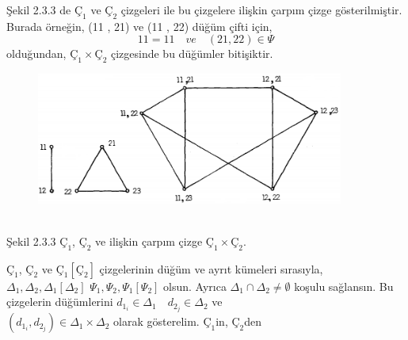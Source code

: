 \documentclass[fleqn]{book}
\begin{document}
Şekil 2.3.3 de $Ç_1$ ve $Ç_2$ çizgeleri ile bu çizgelere
ilişkin çarpım çizge gösterilmiştir. Burada
örneğin, (11 , 21) ve (11 , 22) düğüm çifti için,
\[11=11 \quad ve \quad (21 , 22) \in \Psi \]
olduğundan, $Ç_1 \times Ç_2$ çizgesinde bu düğümler
bitişiktir.
\\
\begin{figure}[htb]
	\centering
	\includegraphics[width=0.9\textwidth]{images/ceyhun-68-fig01}
\end{figure}
\\
Şekil 2.3.3 $Ç_1$, $Ç_2$ ve ilişkin çarpım çizge $Ç_1 \times Ç_2$.
\begin{tanim}
	$Ç_1$, $Ç_2$ ve $Ç_1 [Ç_2]$ çizgelerinin
	düğüm ve ayrıt kümeleri sırasıyla,
	$\Delta_1, \Delta_2, \Delta_1 [\Delta_2]$  $\Psi_1, \Psi_2, \Psi_1 [\Psi_2]$
	olsun. Ayrıca
	$\Delta_1 \cap \Delta_2 \neq \emptyset$ koşulu sağlansın. Bu
	çizgelerin düğümlerini
	$d_{1_i} \in \Delta_1 \quad d_{2_j} \in \Delta_2$ ve \\
	$(d_{1_i}, d_{2_j}) \in \Delta_1 \times \Delta_2$
	olarak gösterelim. $Ç_1$in, $Ç_2$den
\end{tanim}
\end{document}
